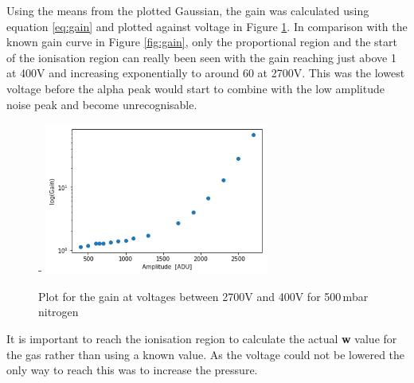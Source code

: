 \documentclass[a4paper]{article}
\begin{document}
\noindent Using the means from the plotted Gaussian, the gain was calculated using equation \ref{eq:gain} and plotted against voltage in Figure \ref{fig:gain1}. In comparison with the known gain curve in Figure \ref{fig:gain}, only the proportional region and the start of the ionisation region can really been seen with the gain reaching just above 1 at 400V and increasing exponentially to around 60 at 2700V. This was the lowest voltage before the alpha peak would start to combine with the low amplitude noise peak and become unrecognisable.
\begin{figure}[H]-
    \centering
    \includegraphics[height=5cm]{plots/gain1.png}
    \caption{Plot for the gain at voltages between 2700V and 400V for 500\,mbar nitrogen}
    \label{fig:gain1}
\end{figure}
\noindent It is important to reach the ionisation region to calculate the actual \textbf{w} value for the gas rather than using a known value. As the voltage could not be lowered the only way to reach this was to increase the pressure.
\end{document}
